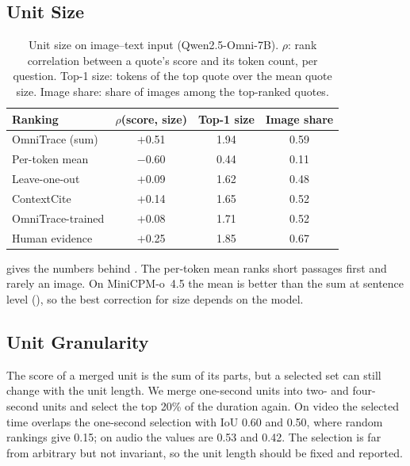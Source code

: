 \subsection{Unit Size}
\label{appendix:size}

\begin{table}[t]
\centering
\tablesize
\setlength{\tabcolsep}{3.5pt}
\begin{tabular}{lccc}
\toprule
\textbf{Ranking} & $\rho$(score, size) & Top-1 size & Image share\\
\midrule
OmniTrace (sum) & $+$0.51 & 1.94 & 0.59\\
Per-token mean & $-$0.60 & 0.44 & 0.11\\
Leave-one-out & $+$0.09 & 1.62 & 0.48\\
ContextCite & $+$0.14 & 1.65 & 0.52\\
OmniTrace-trained & $+$0.08 & 1.71 & 0.52\\
Human evidence & $+$0.25 & 1.85 & 0.67\\
\bottomrule
\end{tabular}
\caption{Unit size on image--text input (Qwen2.5-Omni-7B). $\rho$: rank correlation between a quote's score and its token count, per question. Top-1 size: tokens of the top quote over the mean quote size. Image share: share of images among the top-ranked quotes.}
\label{tab:size}
\end{table}

 gives the numbers behind . The per-token mean ranks short passages first and rarely an image. On MiniCPM-o~4.5 the mean is better than the sum at sentence level (), so the best correction for size depends on the model.

\subsection{Unit Granularity}
\label{appendix:granularity}

The score of a merged unit is the sum of its parts, but a selected set can still change with the unit length.
We merge one-second units into two- and four-second units and select the top 20\% of the duration again.
On video the selected time overlaps the one-second selection with IoU 0.60 and 0.50, where random rankings give 0.15; on audio the values are 0.53 and 0.42.
The selection is far from arbitrary but not invariant, so the unit length should be fixed and reported.

